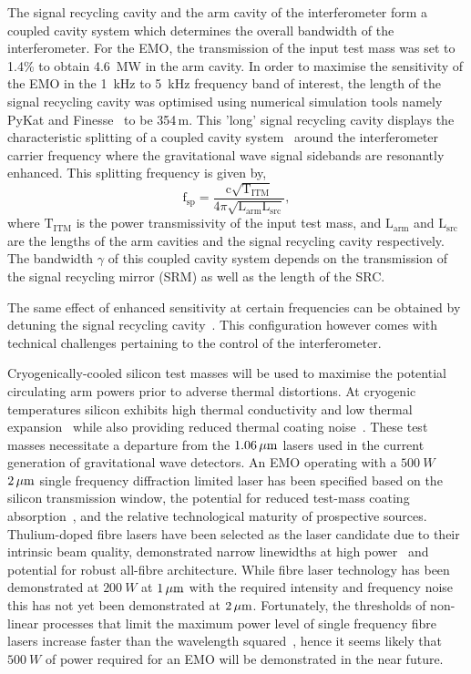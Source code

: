 \documentclass[prx,superscriptaddress,twocolumn,nopreprintnumbers,floatfix,nofootinbib]{revtex4}
\begin{document}
The signal recycling cavity and the arm cavity of the interferometer form a coupled cavity system which determines the overall bandwidth of the interferometer. For the EMO, the transmission of the input test mass was set to 1.4\% to obtain 4.6~MW in the arm cavity. In order to maximise the sensitivity of the EMO in the 1~kHz to 5~kHz frequency band of interest, the length of the signal recycling cavity was optimised using numerical simulation tools namely PyKat and Finesse~\cite{Finesse,finesse1,brown2020pykat} to be 354\,m. This 'long' signal recycling cavity displays the characteristic splitting of a coupled cavity system~\cite{DEM95,martynov19} around the interferometer carrier frequency where the gravitational wave signal sidebands are resonantly enhanced. This splitting frequency is given by,
	\begin{equation}
	\mathrm{f_{sp}} = \frac{\mathrm{c} \sqrt{\mathrm{{T_{ITM}}}}}{4 \pi \sqrt{\mathrm{L_{arm}}\mathrm{L_{src}}}},
	\label{eqn1}
	\end{equation} 
	where $\mathrm{T_{ITM}}$ is the power transmissivity of the input test mass, and $\mathrm{L_{arm}}$ and $\mathrm{L_{src}}$ are the lengths of the arm cavities and the signal recycling cavity respectively. The bandwidth $\gamma$ of this coupled cavity system depends on the transmission of the signal recycling mirror (SRM) as well as the length of the SRC.
 
 The same effect of enhanced sensitivity at certain frequencies can be obtained by detuning the signal recycling cavity~\cite{SRCdetuned}. This configuration however comes with technical challenges pertaining to the control of the interferometer.

Cryogenically-cooled silicon test masses will be used to maximise the potential circulating arm powers prior to adverse thermal distortions. At cryogenic temperatures silicon exhibits high thermal conductivity and low thermal expansion~\cite{kim2018} while also providing reduced thermal coating noise~\cite{shapiro2017cryogenically}. These test masses necessitate a departure from the $\unit[1.06]{\mu m}$ lasers used in the current generation of gravitational wave detectors. 
An EMO operating with a $500~{W}$ $\unit[2]{\mu m}$ single frequency diffraction limited laser has been specified based on the silicon transmission window, the potential for reduced test-mass coating absorption~\cite{steinlechner2018}, and the relative technological maturity of prospective sources.
Thulium-doped fibre lasers have been selected as the laser candidate due to their intrinsic beam quality, demonstrated narrow linewidths at high power~\cite{goodno2009} and potential for robust all-fibre architecture. While fibre laser technology has been demonstrated at $200~W$ at $\unit[1]{\mu m}$ with the required intensity and frequency noise~\cite{ buikema2019, wellmann2019} this has not yet been demonstrated at $\unit[2]{\mu m}$. Fortunately, the thresholds of non-linear processes that limit the maximum power level of single frequency fibre lasers increase faster than the wavelength squared~\cite{dawson2008}, hence it seems likely that $500~W$ of power required for an EMO will be demonstrated in the near future.
\end{document}

